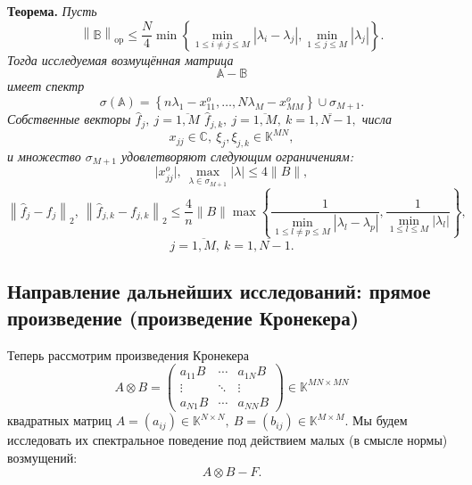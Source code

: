 \documentclass[12pt]{article}
\begin{document}
\begingroup
\textbf{Теорема.}\itshape
    Пусть
    \[
        \left\| \mathbb{B} \right\|_{\mathrm{op}}
        \leq
        \frac{N}{4}
         \min\left\{
             \min\limits_{1\leq i{\neq}j \leq M }{|\lambda_i - \lambda_j|},
             \min\limits_{1\leq j \leq M}{|\lambda_j|}
         \right\}.
        \]
    Тогда исследуемая возмущённая матрица
    \[
        \mathbb{A} - \mathbb{B}
        \]
    имеет спектр
    \[
        \sigma\left(\mathbb{A}\right) =
        \left\{
            n\lambda_1 - x_{11}^o, \ldots, N\lambda_M - x_{MM}^o
        \right\}
        \cup \sigma_{M{+}1}.
        \]
    Собственные векторы
    \(
        \hat{f}_j,
        \ j{=}\overline{1,M}
        \)
    \(
        \hat{f}_{j,k},
        \ j{=}\overline{1,M},
        \ k{=}\overline{1,N{-}1},
        \)
    числа
    \[
        x_{jj}{\in}\mathbb{C},
        \ \xi_j, \xi_{j,k}{\in}\mathbb{K}^{MN},
        \]
    и множество \( \sigma_{M{+}1} \)
    удовлетворяют следующим ограничениям:
\[
    \lvert x_{jj}^o\rvert,
    \ \max_{\lambda\in\sigma_{M{+}1}} \lvert\lambda\rvert
    \leq 4\|B\|,
\]
\[
    \left\| \hat{f}_j - f_j \right\|_2,
    \ \left\| \hat{f}_{j,k} - f_{j,k}\right\|_2
    \leq
    \frac4n \|B\|
         \max\left\{
         \frac{1}{
             \min\limits_{1\leq l{\neq}p \leq M }{|\lambda_l - \lambda_p|}},
         \frac{1}{
             \min\limits_{1\leq l \leq M}{|\lambda_l|}}
         \right\},
\]
    \[
        j{=}\overline{1,M},
        \ k{=}\overline{1,N{-}1}.
        \]
\endgroup
\subsection*{Направление дальнейших исследований: прямое произведение (произведение Кронекера)}
Теперь рассмотрим произведения Кронекера
\[
    A\otimes B =
    \begin{pmatrix}
        a_{11} B & \cdots & a_{1N} B \\
        \vdots   & \ddots & \vdots \\
        a_{N1} B & \cdots & a_{NN} B
    \end{pmatrix}
    \in \mathbb{K}^{{MN}{\times}{MN}}
\]
    квадратных матриц
\( A={(a_{ij})}\in\mathbb{K}^{N{\times}N},
 \ B={(b_{ij})}\in\mathbb{K}^{M{\times}M}. \)
Мы будем исследовать их спектральное поведение
    под действием малых (в смысле нормы) возмущений:
\begin{equation}\label{nkjpcs-kronperturb}
    A\otimes B - F.
\end{equation}
\end{document}
